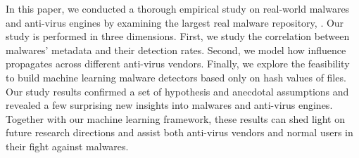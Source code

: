 In this paper, we conducted a thorough empirical study on real-world malwares and anti-virus 
engines by examining the largest real malware repository, \vt. 
Our study is performed in three dimensions.
First, we study the correlation between malwares’ metadata and their detection rates. 
Second, we model how influence propagates across different anti-virus vendors. 
Finally, we explore the feasibility to build machine learning malware detectors based only on hash values of files.
Our study results confirmed a set of hypothesis and anecdotal assumptions
and revealed a few surprising new insights into malwares and anti-virus engines.
Together with our machine learning framework, these results can shed light on future research directions
and assist both anti-virus vendors and normal users in their fight against malwares.
